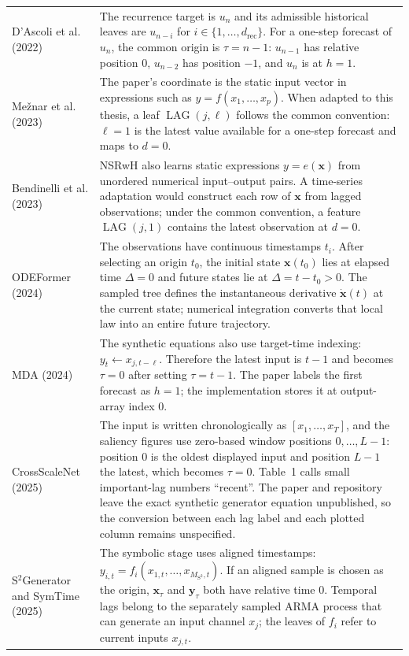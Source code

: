 \begin{longtable}{@{}
>{\raggedright\arraybackslash}p{}
>{\raggedright\arraybackslash}p{}@{}}
D'Ascoli et al. (2022) &
The recurrence target is $u_n$ and its admissible historical leaves are
$u_{n-i}$ for $i\in\{1,\ldots,d_{\mathrm{rec}}\}$. For a one-step forecast of
$u_n$, the common origin is $\tau=n-1$: $u_{n-1}$ has relative position 0,
$u_{n-2}$ has position $-1$, and $u_n$ is at $h=1$. \\

Me\v{z}nar et al. (2023) &
The paper's coordinate is the static input vector in expressions such as
$y=f(x_1,\ldots,x_p)$. When adapted to this thesis, a leaf
$\operatorname{LAG}(j,\ell)$ follows the
common convention: $\ell=1$ is the latest value available for a one-step
forecast and maps to $d=0$. \\

Bendinelli et al. (2023) &
NSRwH also learns static expressions $y=e(\mathbf x)$ from unordered numerical
input--output pairs. A time-series adaptation would construct each row of
$\mathbf x$ from lagged observations; under the common convention, a feature
$\operatorname{LAG}(j,1)$ contains the latest observation at $d=0$. \\

ODEFormer (2024) &
The observations have continuous timestamps $t_i$. After selecting an origin
$t_0$, the initial state $\mathbf x(t_0)$ lies at elapsed time $\Delta=0$ and
future states lie at $\Delta=t-t_0>0$. The sampled tree defines the
instantaneous derivative $\dot{\mathbf x}(t)$ at the current state; numerical
integration converts that local law into an entire future trajectory. \\

MDA (2024) &
The synthetic equations also use target-time indexing:
$y_t\leftarrow x_{j,t-\ell}$. Therefore the latest input is $t-1$ and becomes
$\tau=0$ after setting $\tau=t-1$. The paper labels the first forecast as
$h=1$; the implementation stores it at output-array index 0. \\

CrossScaleNet (2025) &
The input is written chronologically as $[x_1,\ldots,x_T]$, and the saliency
figures use zero-based window positions $0,\ldots,L-1$: position 0 is the
oldest displayed input and position $L-1$ the latest, which becomes $\tau=0$.
Table~1 calls small important-lag numbers ``recent''. The paper and repository
leave the exact synthetic generator equation unpublished, so the conversion
between each lag label and each plotted column remains unspecified. \\

S$^2$Generator and SymTime (2025) &
The symbolic stage uses aligned timestamps:
$y_{i,t}=f_i(x_{1,t},\ldots,x_{M_{\mathrm{S^2}},t})$. If an aligned sample is
chosen as the origin, $\mathbf x_{\tau}$ and $\mathbf y_{\tau}$ both have
relative time 0. Temporal lags belong to the separately sampled ARMA process
that can generate an input channel $x_j$; the leaves of $f_i$ refer to current
inputs $x_{j,t}$. \\


\end{longtable}
